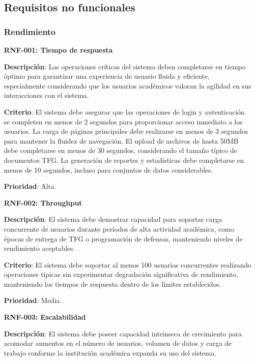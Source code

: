\documentclass[12pt,a4paper,oneside]{report}
\begin{document}
\subsection{Requisitos no funcionales}\label{requisitos-no-funcionales}

\subsubsection{Rendimiento}\label{rendimiento}

\textbf{RNF-001: Tiempo de respuesta}

\textbf{Descripción}: Las operaciones críticas del sistema deben completarse en tiempo óptimo para garantizar una experiencia de usuario fluida y eficiente, especialmente considerando que los usuarios académicos valoran la agilidad en sus interacciones con el sistema.

\textbf{Criterio}: El sistema debe asegurar que las operaciones de login y autenticación se completen en menos de 2 segundos para proporcionar acceso inmediato a los usuarios. La carga de páginas principales debe realizarse en menos de 3 segundos para mantener la fluidez de navegación. El upload de archivos de hasta 50MB debe completarse en menos de 30 segundos, considerando el tamaño típico de documentos TFG. La generación de reportes y estadísticas debe completarse en menos de 10 segundos, incluso para conjuntos de datos considerables.

\textbf{Prioridad}: Alta.

\textbf{RNF-002: Throughput}

\textbf{Descripción}: El sistema debe demostrar capacidad para soportar carga concurrente de usuarios durante períodos de alta actividad académica, como épocas de entrega de TFG o programación de defensas, manteniendo niveles de rendimiento aceptables.

\textbf{Criterio}: El sistema debe soportar al menos 100 usuarios concurrentes realizando operaciones típicas sin experimentar degradación significativa de rendimiento, manteniendo los tiempos de respuesta dentro de los límites establecidos.

\textbf{Prioridad}: Media.

\textbf{RNF-003: Escalabilidad}

\textbf{Descripción}: El sistema debe poseer capacidad intrínseca de crecimiento para acomodar aumentos en el número de usuarios, volumen de datos y carga de trabajo conforme la institución académica expanda su uso del sistema.
\end{document}
